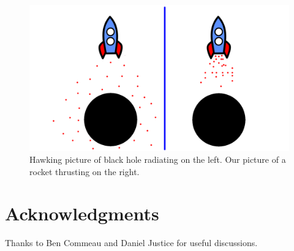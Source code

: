 \documentclass[12pt,a4paper]{article}
\begin{document}
\begin{figure}[h]
\centering
\includegraphics[scale=0.5]{rocket.png}
\caption{Hawking picture of black hole radiating on the left. Our picture of a rocket thrusting on the right.}
\label{rocket}
\end{figure}

\section{Acknowledgments}
Thanks to Ben Commeau and Daniel Justice for useful discussions.



\end{document}
